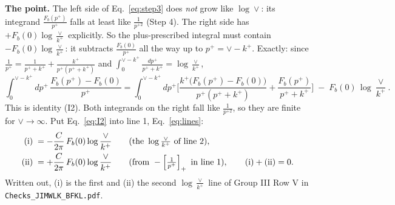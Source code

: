 \documentclass[10pt]{article}
\numberwithin{equation}{section}
\begin{document}
\textbf{The point.} The left side of Eq.~\eqref{eq:step3} does \emph{not} grow like $\log\vee$: its integrand $\frac{F_b(p^+)}{p^+}$ falls at least like $\frac{1}{p^{+2}}$ (Step 4). The right side has $+F_b(0)\log\frac{\vee}{k^+}$ explicitly. So the plus-prescribed integral must contain $-F_b(0)\log\frac{\vee}{k^+}$: it subtracts $\frac{F_b(0)}{p^+}$ all the way up to $p^+=\vee-k^+$. Exactly: since $\frac{1}{p^+}=\frac{1}{p^++k^+}+\frac{k^+}{p^+(p^++k^+)}$ and $\int_0^{\vee-k^+}\frac{dp^+}{p^++k^+}=\log\frac{\vee}{k^+}$,
\begin{equation}
\int_0^{\vee-k^+}dp^+\,\frac{F_b(p^+)-F_b(0)}{p^+}=\int_0^{\vee-k^+}dp^+\bigg[\frac{k^+\big(F_b(p^+)-F_b(0)\big)}{p^+(p^++k^+)}+\frac{F_b(p^+)}{p^++k^+}\bigg]\;-\;F_b(0)\,\log\frac{\vee}{k^+}.
\label{eq:I2}
\end{equation}
This is identity (I2). Both integrands on the right fall like $\frac{1}{p^{+2}}$, so they are finite for $\vee\to\infty$. Put Eq.~\eqref{eq:I2} into line 1, Eq.~\eqref{eq:lines}:
\begin{align}
\text{(i)}\;&=-\frac{C}{2\pi}\,F_b(0)\log\frac{\vee}{k^+}\qquad\text{(the }\log\tfrac{\vee}{k^+}\text{ of line 2)},\notag\\
\text{(ii)}\;&=+\frac{C}{2\pi}\,F_b(0)\log\frac{\vee}{k^+}\qquad\text{(from }-\left[\tfrac{1}{p^+}\right]_+\text{ in line 1)},\qquad \text{(i)}+\text{(ii)}=0.
\label{eq:i_ii}
\end{align}
Written out, (i) is the first and (ii) the second $\log\frac{\vee}{k^+}$ line of Group III Row V in \texttt{Checks\_JIMWLK\_BFKL.pdf}.
\end{document}
